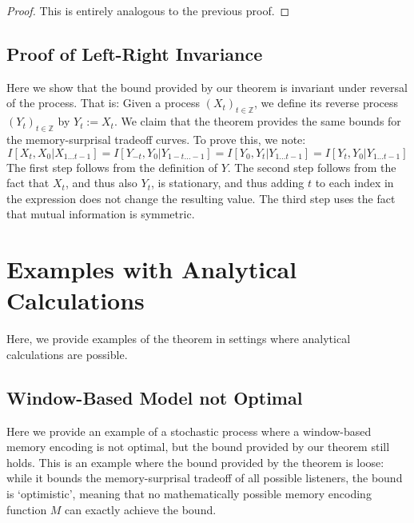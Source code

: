 \documentclass[11pt,letterpaper]{article}
\newcounter{theorem}
\begin{document}
\begin{proof}
This is entirely analogous to the previous proof.
\end{proof}


\subsection{Proof of Left-Right Invariance}

Here we show that the bound provided by our theorem is invariant under reversal of the process.
That is: Given a process $(X_t)_{t \in \mathbb{Z}}$, we define its reverse process $(Y_t)_{t \in \mathbb{Z}}$ by $Y_t := X_t$.
We claim that the theorem provides the same bounds for the memory-surprisal tradeoff curves.
To prove this, we note:
\begin{equation}
	I[X_t, X_0|X_{1\dots t-1}] = I[Y_{-t}, Y_0|Y_{1-t\dots -1}] = I[Y_0, Y_t|Y_{1\dots t-1}] = I[Y_t, Y_0|Y_{1\dots t-1}]
\end{equation}
The first step follows from the definition of $Y$. The second step follows from the fact that $X_t$, and thus also $Y_t$, is stationary, and thus adding $t$ to each index in the expression does not change the resulting value. The third step uses the fact that mutual information is symmetric.


\section{Examples with Analytical Calculations}

Here, we provide examples of the theorem in settings where analytical calculations are possible.


%
%

\subsection{Window-Based Model not Optimal}

Here we provide an example of a stochastic process where a window-based memory encoding is not optimal, but the bound provided by our theorem still holds.
This is an example where the bound provided by the theorem is loose: while it bounds the memory-surprisal tradeoff of all possible listeners, the bound is `optimistic', meaning that no mathematically possible memory encoding function $M$ can exactly achieve the bound.
\end{document}
